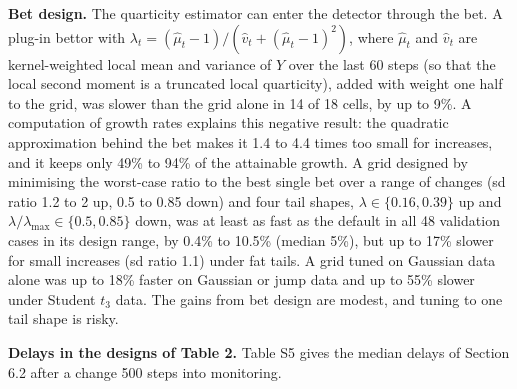 \documentclass[
]{article}
\begin{document}
\textbf{Bet design.} The quarticity estimator can enter the detector
through the bet. A plug-in bettor with
\(\lambda_t = (\hat\mu_t - 1)/(\hat v_t + (\hat\mu_t - 1)^2)\), where
\(\hat\mu_t\) and \(\hat v_t\) are kernel-weighted local mean and
variance of \(Y\) over the last 60 steps (so that the local second
moment is a truncated local quarticity), added with weight one half to
the grid, was slower than the grid alone in 14 of 18 cells, by up to
9\%. A computation of growth rates explains this negative result: the
quadratic approximation behind the bet makes it 1.4 to 4.4 times too
small for increases, and it keeps only 49\% to 94\% of the attainable
growth. A grid designed by minimising the worst-case ratio to the best
single bet over a range of changes (sd ratio 1.2 to 2 up, 0.5 to 0.85
down) and four tail shapes, \(\lambda \in \lbrace 0.16, 0.39 \rbrace\)
up and \(\lambda/\lambda_{\max} \in \lbrace 0.5, 0.85 \rbrace\) down,
was at least as fast as the default in all 48 validation cases in its
design range, by 0.4\% to 10.5\% (median 5\%), but up to 17\% slower for
small increases (sd ratio 1.1) under fat tails. A grid tuned on Gaussian
data alone was up to 18\% faster on Gaussian or jump data and up to 55\%
slower under Student \(t_3\) data. The gains from bet design are modest,
and tuning to one tail shape is risky.

\textbf{Delays in the designs of Table 2.} Table S5 gives the median
delays of Section 6.2 after a change 500 steps into monitoring.
\end{document}

